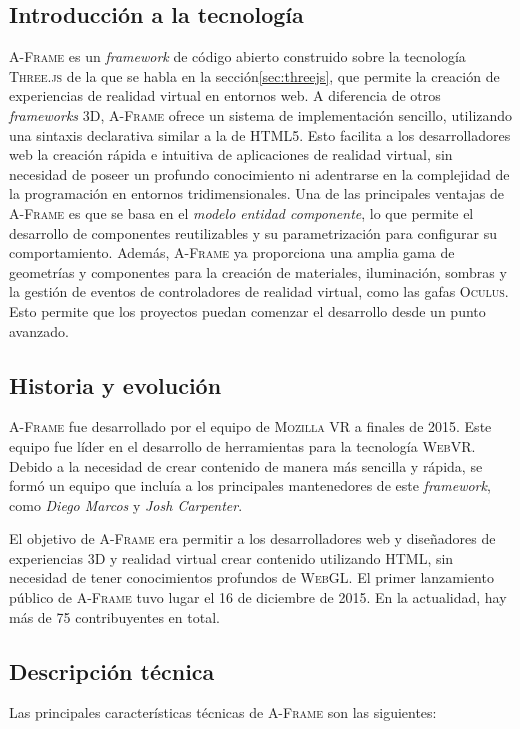 \documentclass[a4paper, 11pt]{book}
\begin{document}
\subsection{Introducción a la tecnología}
\textsc{A-Frame}\cite{aframedocs} es un \emph{\gls{framework}} de código abierto construido sobre la tecnología \textsc{Three.js} de la que se habla en la sección\ref{sec:threejs}, que permite la creación de experiencias de realidad virtual en entornos web. A diferencia de otros \emph{\gls{framework}s} \textsc{3D}, \textsc{A-Frame} ofrece un sistema de implementación sencillo, utilizando una sintaxis declarativa similar a la de \textsc{HTML5}. 
Esto facilita a los desarrolladores web la creación rápida e intuitiva de aplicaciones de realidad virtual, sin necesidad de poseer un profundo conocimiento ni adentrarse en la complejidad de la programación en entornos tridimensionales.
Una de las principales ventajas de \textsc{A-Frame} es que se basa en el \emph{modelo entidad componente}, lo que permite el desarrollo de componentes reutilizables y su parametrización para configurar su comportamiento.
Además, \textsc{A-Frame} ya proporciona una amplia gama de geometrías y componentes para la creación de materiales, iluminación, sombras y la gestión de eventos de controladores de realidad virtual, como las gafas \textsc{Oculus}. Esto permite que los proyectos puedan comenzar el desarrollo desde un punto avanzado.

\subsection{Historia y evolución}
\textsc{A-Frame} fue desarrollado por el equipo de \textsc{Mozilla VR} a finales de 2015. Este equipo fue líder en el desarrollo de herramientas para la tecnología \textsc{WebVR}. Debido a la necesidad de crear contenido de manera más sencilla y rápida, se formó un equipo que incluía a los principales mantenedores de este \emph{\gls{framework}}, como \emph{Diego Marcos} y \emph{Josh Carpenter}. 

El objetivo de \textsc{A-Frame} era permitir a los desarrolladores web y diseñadores de experiencias \textsc{3D} y realidad virtual crear contenido utilizando \textsc{HTML}, sin necesidad de tener conocimientos profundos de \textsc{\gls{WebGL}}. El primer lanzamiento público de \textsc{A-Frame} tuvo lugar el 16 de diciembre de 2015. En la actualidad, hay más de 75 contribuyentes en total.
\subsection{Descripción técnica}
Las principales características técnicas de \textsc{A-Frame} son las siguientes:
\end{document}
